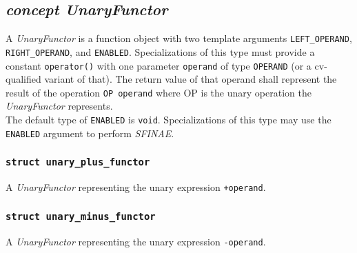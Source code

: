 \documentclass[oneside]{article}
\begin{document}
\subsection{\textit{concept UnaryFunctor}}
A \textit{UnaryFunctor} is a function object with two template arguments \verb+LEFT_OPERAND+,
\verb+RIGHT_OPERAND+, and \verb+ENABLED+. Specializations of this type must provide a
constant \verb+operator()+ with one parameter \verb+operand+ of type \verb+OPERAND+
(or a cv-qualified variant of that). The return value of that operand shall represent the
result of the operation \verb+OP operand+ where OP is the unary operation
the \textit{UnaryFunctor} represents.\\

\noindent{}The default type of \verb+ENABLED+ is \verb+void+. Specializations of this type may use
the \verb+ENABLED+ argument to perform \textit{SFINAE}.

\subsubsection{\texttt{struct unary\_plus\_functor}}
A \textit{UnaryFunctor} representing the unary expression \verb|+operand|.

\subsubsection{\texttt{struct unary\_minus\_functor}}
A \textit{UnaryFunctor} representing the unary expression \verb|-operand|.
\end{document}
